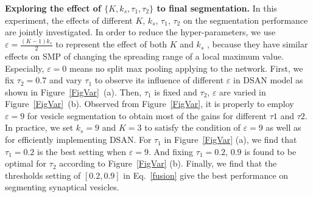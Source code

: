 \noindent\textbf{Exploring the effect of $\{K, k_s, \tau_1, \tau_2\}$ to final segmentation.}
In this experiment, the effects of different $K$, $k_s$, $\tau_1$, $\tau_2$ on the segmentation performance are jointly investigated.
In order to reduce the hyper-parameters, we use $\varepsilon=\frac{(K-1)k_s}{2}$ to represent the effect of both $K$ and $k_s$ , because they have similar effects on SMP of changing the spreading range of a local maximum value.
Especially, $\varepsilon=0$ means no split max pooling applying to the network.
First, we fix $\tau_2=0.7$ and vary $\tau_1$ to observe its influence of different $\varepsilon$ in DSAN model as shown in Figure~\ref{FigVar}~(a).
Then, $\tau_1$ is fixed and $\tau_2$, $\varepsilon$ are varied in Figure~\ref{FigVar}~(b).
Observed from Figure~\ref{FigVar}, it is properly to employ $\varepsilon=9$ for vesicle segmentation to obtain most of the gains for different $\tau1$ and $\tau2$.
In practice, we set $k_s=9$ and $K=3$ to satisfy the condition of $\varepsilon=9$ as well as for efficiently implementing DSAN.
For $\tau_1$ in Figure~\ref{FigVar} (a), we find that $\tau_1=0.2$ is the best setting when $\varepsilon=9$.
And fixing $\tau_1=0.2$, $0.9$ is found to be optimal for $\tau_2$ according to Figure~\ref{FigVar} (b).
Finally, we find that the thresholds setting of $[0.2, 0.9]$ in Eq.~\ref{fusion} give the best performance on segmenting synaptical vesicles.

